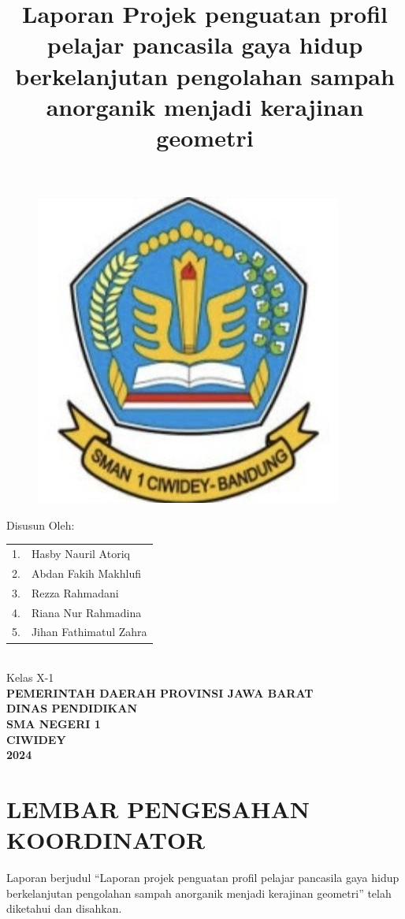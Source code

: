 \documentclass[a4paper,12pt, bahasa]{article}
\date{}
\title{Laporan Projek penguatan profil pelajar pancasila gaya hidup berkelanjutan pengolahan sampah anorganik menjadi kerajinan geometri}
\begin{document}
\maketitle
\thispagestyle{empty}
\begin{figure}[ht]
    \centering
    \includegraphics[width=0.3\linewidth]{images/sman1.png}
\end{figure}
\vspace{2cm}

\begin{center}
    Disusun Oleh: \\
    \begin{tabular}{ll}
         1.& Hasby Nauril Atoriq  \\
         2.& Abdan Fakih Makhlufi \\
         3.& Rezza Rahmadani \\
         4.& Riana Nur Rahmadina \\
         5.& Jihan Fathimatul Zahra\\
    \end{tabular}\\
    \vspace{0.5cm}
    Kelas X-1\\
    \vspace{1cm}
    \textbf{PEMERINTAH DAERAH PROVINSI JAWA BARAT}\\
    \textbf{DINAS PENDIDIKAN}\\
    \textbf{SMA NEGERI 1}\\
    \textbf{CIWIDEY}\\
    \textbf{2024}
\end{center}
\pagebreak

    \section*{LEMBAR PENGESAHAN KOORDINATOR}
Laporan berjudul “Laporan projek penguatan profil pelajar pancasila gaya hidup berkelanjutan pengolahan sampah anorganik menjadi kerajinan geometri” telah diketahui dan disahkan. 
\vspace{2cm}
\\
\end{document}
